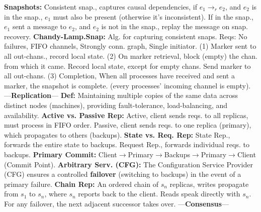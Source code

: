 \newpage

\begin{multicols}{2}

\noindent
\textbf{Snapshots:} Consistent snap., captures causal dependencies, if 
$e_1 \to_r e_2$, and $e_2$ is in the snap., $e_1$ must also be present (otherwise it's inconsistent). If in the 
snap., $e_1$ sent a message to $e_2$, and $e_2$ is not in the snap., replay the message on snap. recovery.
\textbf{Chandy-Lamp.Snap:} Alg. for capturing consistent snaps. Reqs: No failures, FIFO channels, Strongly conn. graph, Single initiator.
(1) Marker sent to all out-chans., record local state. (2) On marker retrieval, block (empty) the chan. from which it came. Record local state, except for empty chans. Send marker to all out-chans.
(3) Completion, When all processes have received and sent a marker, the snapshot is complete.
(every processes' incoming channel is empty).
---\textbf{Replication}---
\textbf{Def:} Maintaining multiple copies of the same data across distinct nodes (machines), providing fault-tolerance, load-balancing, and availability.
\textbf{Active vs. Passive Rep:} Active, client sends reqs. to all replicas, must process in FIFO order. Passive, client sends reqs. to one replica (primary), which propagates to others (backups).
\textbf{State vs. Req. Rep:} State Rep., forwards the entire state to backups. Request Rep., forwards individual reqs. to backups.
\textbf{Primary Commit:} Client$\to$Primary$\to$Backups$\to$Primary$\to$Client (Commit Point).
\textbf{Arbitrary Serv. (CFG):} The Configuration Service Provider (CFG) ensures a controlled \textbf{failover} (switching to backups) in the event of a primary failure.
\textbf{Chain Rep:} An ordered chain of $s_n$ replicas, writes propagate from $s_1$ to $s_n$, where $s_n$ reports back to the client. Reads speak directly with $s_n$. For any failover, the next adjacent successor takes over.
---\textbf{Consensus}---
\pagebreak
\end{multicols}

